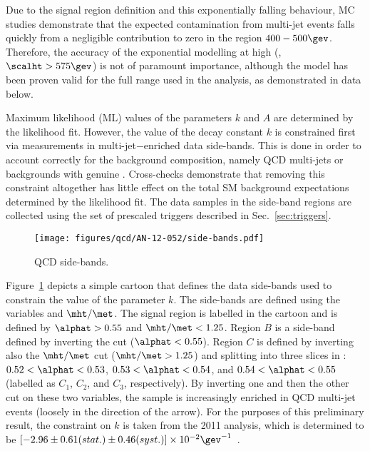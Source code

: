 Due to the signal region definition and this exponentially falling
behaviour, MC studies demonstrate that the expected contamination from
multi-jet events falls quickly from a negligible contribution to zero
in the region $400-500\gev$. Therefore, the accuracy of the
exponential modelling at high \scalht (\ie, $\scalht > 575\gev$) is
not of paramount importance, although the model has been proven valid
for the full \scalht range used in the analysis, as demonstrated in
data below.

Maximum likelihood (ML) values of the parameters $k$ and $A$ are
determined by the likelihood fit. However, the value of the decay
constant $k$ is constrained first via measurements in
multi-jet$-$enriched data side-bands. This is done in order to account
correctly for the background composition, namely QCD multi-jets or
backgrounds with genuine \met. Cross-checks demonstrate that removing
this constraint altogether has little effect on the total SM
background expectations determined by the likelihood fit. The data
samples in the side-band regions are collected using the set of
prescaled \httrigger triggers described in Sec.~\ref{sec:triggers}.

\begin{figure}[!h]
  \begin{center}
    \texttt{[image: figures/qcd/AN-12-052/side-bands.pdf]}
    \caption{QCD side-bands.}
    \label{fig:side-bands}
  \end{center}
\end{figure}

Figure~\ref{fig:side-bands} depicts a simple cartoon that defines the
data side-bands used to constrain the value of the parameter $k$. The
side-bands are defined using the variables \alphat and
$\mht/\met$. The signal region is labelled in the cartoon and is
defined by $\alphat > 0.55$ and $\mht/\met < 1.25$. Region $B$ is a
side-band defined by inverting the \alphat cut (\ie $\alphat <
0.55$). Region $C$ is defined by inverting also the $\mht/\met$ cut
(\ie $\mht/\met > 1.25$) and splitting into three slices in \alphat:
$0.52 < \alphat < 0.53$, $0.53 < \alphat < 0.54$, and $0.54 < \alphat
< 0.55$ (labelled as $C_1$, $C_2$, and $C_3$, respectively). By
inverting one and then the other cut on these two variables, the
sample is increasingly enriched in QCD multi-jet events (loosely in
the direction of the arrow). For the purposes of this preliminary
result, the constraint on $k$ is taken from the 2011 analysis, which
is determined to be $[ -2.96 \pm 0.61 (stat.) \pm 0.46 (syst.)  ]
\times 10^{-2}\gev^{-1}$~\cite{RA1PAS2011}.

